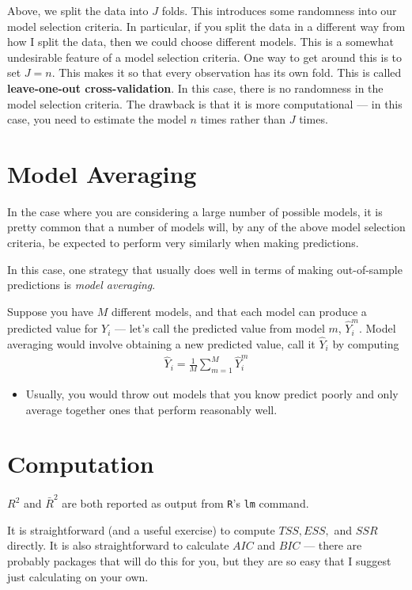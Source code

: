 \documentclass[
  letterpaper,
  DIV=11,
  numbers=noendperiod]{scrreprt}
\providecommand{\tightlist}{%
  \setlength{\itemsep}{0pt}\setlength{\parskip}{0pt}}\usepackage{longtable,booktabs,array}
\begin{document}
Above, we split the data into \(J\) folds. This introduces some
randomness into our model selection criteria. In particular, if you
split the data in a different way from how I split the data, then we
could choose different models. This is a somewhat undesirable feature of
a model selection criteria. One way to get around this is to set
\(J=n\). This makes it so that every observation has its own fold. This
is called \textbf{leave-one-out cross-validation}. In this case, there
is no randomness in the model selection criteria. The drawback is that
it is more computational --- in this case, you need to estimate the
model \(n\) times rather than \(J\) times.

\section{Model Averaging}\label{model-averaging}

In the case where you are considering a large number of possible models,
it is pretty common that a number of models will, by any of the above
model selection criteria, be expected to perform very similarly when
making predictions.

In this case, one strategy that usually does well in terms of making
out-of-sample predictions is \emph{model averaging}.

Suppose you have \(M\) different models, and that each model can produce
a predicted value for \(Y_i\) --- let's call the predicted value from
model \(m\), \(\hat{Y}_i^m\). Model averaging would involve obtaining a
new predicted value, call it \(\hat{Y}_i\) by computing \begin{align*}
  \hat{Y}_i = \frac{1}{M} \sum_{m=1}^M \hat{Y}_i^m
\end{align*}

\begin{itemize}
\tightlist
\item
  Usually, you would throw out models that you know predict poorly and
  only average together ones that perform reasonably well.
\end{itemize}

\section{Computation}\label{computation-9}

\(R^2\) and \(\bar{R}^2\) are both reported as output from \texttt{R}'s
\texttt{lm} command.

It is straightforward (and a useful exercise) to compute \(TSS, ESS,\)
and \(SSR\) directly. It is also straightforward to calculate \(AIC\)
and \(BIC\) --- there are probably packages that will do this for you,
but they are so easy that I suggest just calculating on your own.
\end{document}
